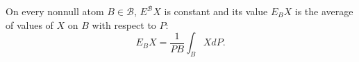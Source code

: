 On every nonnull atom $B \in \mathcal{B}$, $E^{\mathcal{B}}X$ is constant and its value $E_BX$ is the average of values of $X$ on $B$ with respect to $P$: $$E_BX = \frac{1}{PB} \int_B X dP.$$
